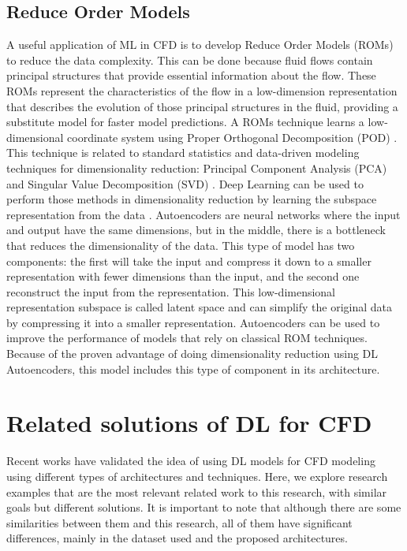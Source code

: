 \subsection*{\textbf{Reduce Order Models}}
A useful application of ML in CFD is to develop Reduce Order Models (ROMs) to reduce the data complexity. This can be done because fluid flows contain principal structures that provide essential information about the flow. These ROMs represent the characteristics of the flow in a low-dimension representation that describes the evolution of those principal structures in the fluid, providing a substitute model for faster model predictions. A ROMs technique learns a low-dimensional coordinate system using Proper Orthogonal Decomposition (POD) \cite{taira_modal_2017} \cite{rowley_model_2017}. This technique is related to standard statistics and data-driven modeling techniques for dimensionality reduction: Principal Component Analysis (PCA) and Singular Value Decomposition (SVD) \cite{brunton_data-driven_2022}. Deep Learning can be used to perform those methods in dimensionality reduction by learning the subspace representation from the data \cite{lusch_deep_2018}. Autoencoders are neural networks where the input and output have the same dimensions, but in the middle, there is a bottleneck that reduces the dimensionality of the data. This type of model has two components: the first will take the input and compress it down to a smaller representation with fewer dimensions than the input, and the second one reconstruct the input from the representation. This low-dimensional representation subspace is called latent space and can simplify the original data by compressing it into a smaller representation. Autoencoders can be used to improve the performance of models that rely on classical ROM techniques. Because of the proven advantage of doing dimensionality reduction using DL Autoencoders, this model includes this type of component in its architecture.

\section{Related solutions of DL for CFD}
\label{sec:similarworks}
Recent works have validated the idea of using DL models for CFD modeling using different types of architectures and techniques. Here, we explore research examples that are the most relevant related work to this research, with similar goals but different solutions. It is important to note that although there are some similarities between them and this research, all of them have significant differences, mainly in the dataset used and the proposed architectures.

